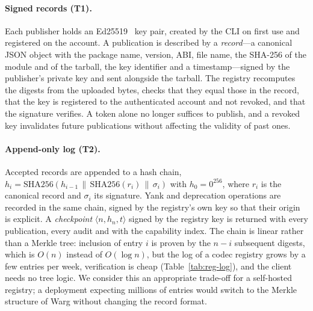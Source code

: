 \paragraph{Signed records (T1).}
Each publisher holds an Ed25519~\cite{bernstein2012ed25519} key pair, created
by the CLI on first use and registered on the account. A publication is
described by a \emph{record}---a canonical JSON object with the package name,
version, ABI, file name, the SHA-256 of the module and of the tarball, the key
identifier and a timestamp---signed by the publisher's private key and sent
alongside the tarball. The registry recomputes the digests from the uploaded
bytes, checks that they equal those in the record, that the key is registered
to the authenticated account and not revoked, and that the signature verifies.
A token alone no longer suffices to publish, and a revoked key invalidates
future publications without affecting the validity of past ones.

\paragraph{Append-only log (T2).}
Accepted records are appended to a hash chain,
$h_i = \mathrm{SHA256}(h_{i-1} \,\|\, \mathrm{SHA256}(r_i) \,\|\, \sigma_i)$
with $h_0 = 0^{256}$, where $r_i$ is the canonical record and $\sigma_i$ its
signature. Yank and deprecation operations are recorded in the same chain,
signed by the registry's own key so that their origin is explicit. A
\emph{checkpoint} $\langle n, h_n, t\rangle$ signed by the registry key is
returned with every publication, every audit and with the capability index.
The chain is linear rather than a Merkle tree: inclusion of entry $i$ is
proven by the $n-i$ subsequent digests, which is $O(n)$ instead of
$O(\log n)$, but the log of a codec registry grows by a few entries per week,
verification is cheap (Table~\ref{tab:reg-log}), and the client needs no
tree logic. We consider this an appropriate trade-off for a self-hosted
registry; a deployment expecting millions of entries would switch to the
Merkle structure of Warg without changing the record format.

